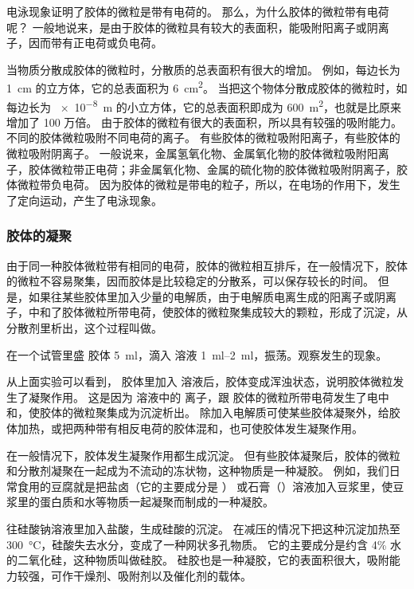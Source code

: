 电泳现象证明了胶体的微粒是带有电荷的。
那么，为什么胶体的微粒带有电荷呢？
一般地说来，是由于胶体的微粒具有较大的表面积，能吸附阳离子或阴离子，因而带有正电荷或负电荷。

当物质分散成胶体的微粒时，分散质的总表面积有很大的增加。
例如，每边长为 \qty{1}{cm} 的立方体，它的总表面积为 \qty{6}{cm^2}。
当把这个物体分散成胶体的微粒时，如每边长为 \qty{e-8}{m} 的小立方体，它的总表面积即成为 \qty{600}{m^2}，也就是比原来增加了 100 万倍。
由于胶体的微粒有很大的表面积，所以具有较强的吸附能力。
不同的胶体微粒吸附不同电荷的离子。
有些胶体的微粒吸附阳离子，有些胶体的微粒吸附阴离子。
一般说来，金属氢氧化物、金属氧化物的胶体微粒吸附阳离子，胶体微粒带正电荷；非金属氧化物、金属的硫化物的胶体微粒吸附阴离子，胶体微粒带负电荷。
因为胶体的微粒是带电的粒子，所以，在电场的作用下，发生了定向运动，产生了电泳现象。

\subsubsection{胶体的凝聚}
由于同一种胶体微粒带有相同的电荷，胶体的微粒相互排斥，在一般情况下，胶体的微粒不容易聚集，因而胶体是比较稳定的分散系，可以保存较长的时间。
但是，如果往某些胶体里加入少量的电解质，由于电解质电离生成的阳离子或阴离子，中和了胶体微粒所带电荷，使胶体的微粒聚集成较大的颗粒，形成了沉淀，从分散剂里析出，这个过程叫做。

\begin{Experiment}
  在一个试管里盛  胶体 \qty{5}{ml}，滴入  溶液 \qtyrange{1}{2}{ml}，振荡。观察发生的现象。
\end{Experiment}

从上面实验可以看到， 胶体里加入  溶液后，胶体变成浑浊状态，说明胶体微粒发生了凝聚作用。
这是因为  溶液中的  离子，跟  胶体的微粒所带电荷发生了电中和，使胶体的微粒聚集成为沉淀析出。
除加入电解质可使某些胶体凝聚外，给胶体加热，或把两种带有相反电荷的胶体混和，也可使胶体发生凝聚作用。

在一般情况下，胶体发生凝聚作用都生成沉淀。
但有些胶体凝聚后，胶体的微粒和分散剂凝聚在一起成为不流动的冻状物，这种物质是一种凝胶。
例如，我们日常食用的豆腐就是把盐卤（它的主要成分是 ） 或石膏（）溶液加入豆浆里，使豆浆里的蛋白质和水等物质一起凝聚而制成的一种凝胶。

往硅酸钠溶液里加入盐酸，生成硅酸的沉淀。
在减压的情况下把这种沉淀加热至 \qty{300}{\celsius}，硅酸失去水分，变成了一种网状多孔物质。
它的主要成分是约含 4\% 水的二氧化硅，这种物质叫做硅胶。
硅胶也是一种凝胶，它的表面积很大，吸附能力较强，可作干燥剂、吸附剂以及催化剂的载体。

